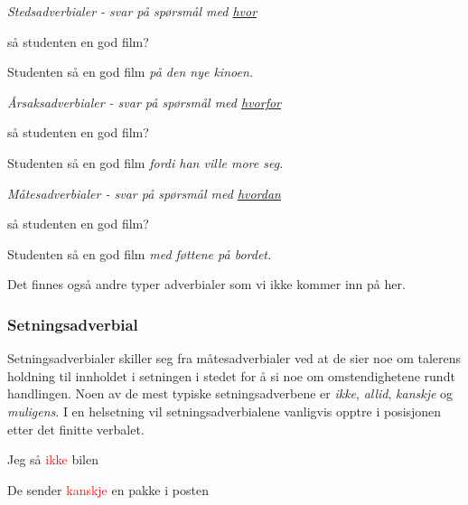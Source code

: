 \documentclass{article}
\begin{document}
{\it Stedsadverbialer - svar p{\aa} sp{\o}rsm{\aa}l med \underline{hvor}}

\begin{exe}
\ex
\begin{xlist}
 s{\aa} studenten en god film?

\ex Studenten s{\aa} en god film {\it p{\aa} den nye kinoen.}
\end{xlist}
\end{exe}

{\it {\AA}rsaksadverbialer - svar p{\aa} sp{\o}rsm{\aa}l med \underline{hvorfor}}

\begin{exe}
\ex
\begin{xlist}
 s{\aa} studenten en god film?

\ex Studenten s{\aa} en god film {\it fordi han ville more seg.}
\end{xlist}
\end{exe}

{\it M{\aa}tesadverbialer - svar p{\aa} sp{\o}rsm{\aa}l med \underline{hvordan}}

\begin{exe}
\ex
\begin{xlist}
 s{\aa} studenten en god film?

\ex Studenten s{\aa} en god film {\it med f{\o}ttene p{\aa} bordet.}
\end{xlist}
\end{exe}

Det finnes ogs{\aa} andre typer adverbialer som vi ikke kommer inn p{\aa} her.

\subsubsection{Setningsadverbial}

Setningsadverbialer skiller seg fra m{\aa}tesadverbialer ved at de sier noe om talerens holdning til innholdet i setningen i stedet for {\aa} si noe om omstendighetene rundt handlingen. Noen av de mest typiske setningsadverbene er {\it ikke}, {\it allid}, {\it kanskje} og {\it muligens}. I en helsetning vil setningsadverbialene vanligvis opptre i posisjonen etter det finitte verbalet.

\begin{exe}
\ex
\begin{xlist}
\ex Jeg s{\aa} \textcolor{red}{ikke} bilen

\ex De sender \textcolor{red}{kanskje} en pakke i posten
\end{xlist}
\end{exe}
\end{document}
